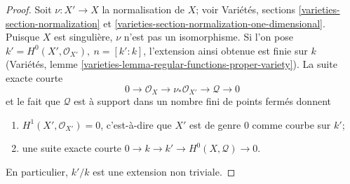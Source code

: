\begin{proof}
Soit $\nu : X' \to X$ la normalisation de $X$; voir Variétés, sections \ref{varieties-section-normalization} et \ref{varieties-section-normalization-one-dimensional}. Puisque $X$ est singulière, $\nu$ n'est pas un isomorphisme. Si l'on pose $k' = H^0(X', \mathcal{O}_{X'}),\ n = [k' : k]$, l'extension ainsi obtenue est finie sur $k$ (Variétés, lemme \ref{varieties-lemma-regular-functions-proper-variety}). La suite exacte courte $$
0 \to \mathcal{O}_X \to \nu_*\mathcal{O}_{X'} \to \mathcal{Q} \to 0
$$ et le fait que $\mathcal{Q}$ est à support dans un nombre fini de points fermés donnent \begin{enumerate} \item $H^1(X', \mathcal{O}_{X'}) = 0$, c'est-à-dire que $X'$ est de genre $0$ comme courbe sur $k'$; \item une suite exacte courte $0 \to k \to k' \to H^0(X, \mathcal{Q}) \to 0$. \end{enumerate} En particulier, $k'/k$ est une extension non triviale.


\end{proof}
